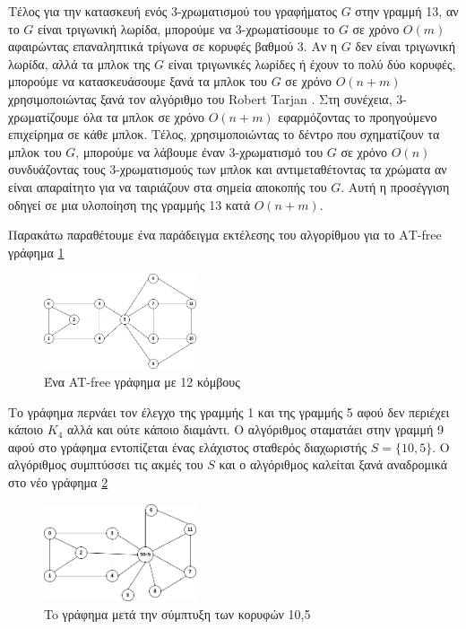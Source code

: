 Τέλος για την κατασκευή ενός 3-χρωματισμού του γραφήματος $G$ στην γραμμή 13, αν το $G$ είναι τριγωνική λωρίδα, μπορούμε να 3-χρωματίσουμε το $G$ σε χρόνο $O(m)$ αφαιρώντας επαναληπτικά τρίγωνα σε κορυφές βαθμού 3. Αν η $G$ δεν είναι τριγωνική λωρίδα, αλλά τα μπλοκ της $G$ είναι τριγωνικές λωρίδες ή έχουν το πολύ δύο κορυφές, μπορούμε να κατασκευάσουμε ξανά τα μπλοκ του $G$ σε χρόνο $O(n + m)$ χρησιμοποιώντας ξανά τον αλγόριθμο του Robert Tarjan \cite{tarjan-depth-first-search}. Στη συνέχεια, 3-χρωματίζουμε όλα τα μπλοκ σε χρόνο $O(n + m)$ εφαρμόζοντας το προηγούμενο επιχείρημα σε κάθε μπλοκ. Τέλος, χρησιμοποιώντας το δέντρο που σχηματίζουν τα μπλοκ του $G$, μπορούμε να λάβουμε έναν 3-χρωματισμό του $G$ σε χρόνο $O(n)$ συνδυάζοντας τους 3-χρωματισμούς των μπλοκ και αντιμεταθέτοντας τα χρώματα αν είναι απαραίτητο για να ταιριάζουν στα σημεία αποκοπής του $G$. Αυτή η προσέγγιση οδηγεί σε μια υλοποίηση της γραμμής 13 κατά $O(n + m)$.



Παρακάτω παραθέτουμε ένα παράδειγμα εκτέλεσης του αλγορίθμου για το ΑΤ-free γράφημα \ref{fig:ex-coloring-1}

\begin{figure}[H]
	\centering
	\includegraphics[width=0.4\textwidth]{pictures/ex-coloring-1.png} 
	\caption{Ένα AT-free γράφημα με 12 κόμβους}
	\label{fig:ex-coloring-1}
\end{figure}

Το γράφημα περνάει τον έλεγχο της γραμμής 1 και της γραμμής 5 αφού δεν περιέχει κάποιο $K_4$ αλλά και ούτε κάποιο διαμάντι. Ο αλγόριθμος σταματάει στην γραμμή 9 αφού στο γράφημα εντοπίζεται ένας ελάχιστος σταθερός διαχωριστής $S = \{ 10, 5\}$. Ο αλγόριθμος συμπτύσσει τις ακμές του $S$ και ο αλγόριθμος καλείται ξανά αναδρομικά στο νέο γράφημα \ref{fig:ex-coloring-2}

\begin{figure}[H]
	\centering
	\includegraphics[width=0.4\textwidth]{pictures/ex-coloring-2.png} 
	\caption{To γράφημα μετά την σύμπτυξη των κορυφών 10,5}
	\label{fig:ex-coloring-2}
\end{figure}

